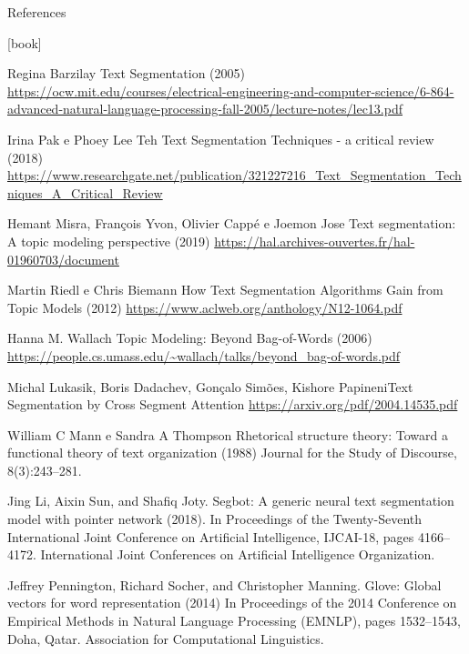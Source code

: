 \documentclass[10pt]{beamer}
\begin{document}
\begin{frame}[allowframebreaks]{References}
    \begin{thebibliography}{}

        [book]
        
        Regina Barzilay
        \newblock Text Segmentation (2005)
        \newblock \url{https://ocw.mit.edu/courses/electrical-engineering-and-computer-science/6-864-advanced-natural-language-processing-fall-2005/lecture-notes/lec13.pdf}
        
        Irina Pak e Phoey Lee Teh
        \newblock Text Segmentation Techniques - a critical review (2018)
        \newblock \url{https://www.researchgate.net/publication/321227216_Text_Segmentation_Techniques_A_Critical_Review}
        
        Hemant Misra, François Yvon, Olivier Cappé e Joemon Jose
        \newblock Text segmentation: A topic modeling perspective (2019)
        \newblock \url{https://hal.archives-ouvertes.fr/hal-01960703/document}
        
        Martin Riedl e Chris Biemann
        \newblock How Text Segmentation Algorithms Gain from Topic Models (2012)
        \newblock \url{https://www.aclweb.org/anthology/N12-1064.pdf}
        
        Hanna M. Wallach
        \newblock Topic Modeling: Beyond Bag-of-Words (2006)
        \newblock \url{https://people.cs.umass.edu/~wallach/talks/beyond_bag-of-words.pdf}
        
        Michal Lukasik, Boris Dadachev, Gonçalo Simões, Kishore Papineni\newblock Text Segmentation by Cross Segment Attention
        \newblock \url{https://arxiv.org/pdf/2004.14535.pdf}
        
        William C Mann e Sandra A Thompson
        \newblock Rhetorical structure theory: Toward a functional theory of text organization (1988)
        \newblock Journal for the Study of Discourse, 8(3):243–281.
        
        Jing Li, Aixin Sun, and Shafiq Joty. 
        \newblock Segbot: A generic neural text segmentation model with pointer network (2018). 
        \newblock In Proceedings of the Twenty-Seventh International Joint Conference on Artificial Intelligence, IJCAI-18, pages 4166–4172. International Joint Conferences on Artificial Intelligence Organization.
        
        Jeffrey Pennington, Richard Socher, and Christopher Manning. \newblock Glove: Global vectors for word representation (2014)
        \newblock In Proceedings of the 2014 Conference on Empirical Methods in Natural Language Processing (EMNLP), pages 1532–1543, Doha, Qatar. Association for Computational Linguistics.
        
    

    \end{thebibliography}
\end{frame}
\end{document}
